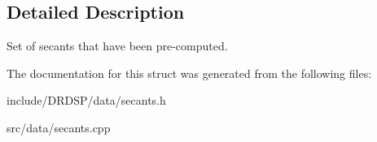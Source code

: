 \subsection{Detailed Description}
Set of secants that have been pre-\/computed. 

The documentation for this struct was generated from the following files\-:\begin{DoxyCompactItemize}
\item 
include/\-D\-R\-D\-S\-P/data/secants.\-h\item 
src/data/secants.\-cpp\end{DoxyCompactItemize}
